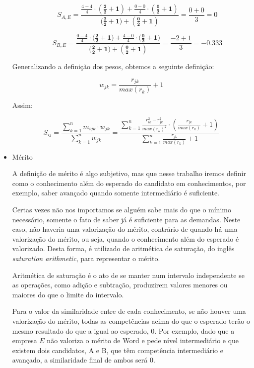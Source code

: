 \documentclass[preprint,12pt]{elsarticle}
\begin{document}
\begin{itemize}
\begin{itemize}
        $$ S_{A,E} = \frac{\tfrac{4 - 4}{4} \cdot \boldsymbol{(\tfrac{2}{2} + 1)} + \tfrac{0 - 0}{4} \cdot \boldsymbol{(\tfrac{0}{2} + 1)}}{(\boldsymbol{\tfrac{2}{2} + 1)} + \boldsymbol{(\tfrac{0}{2} + 1)}} = \frac{0 + 0}{3} = 0 $$
        
        $$ S_{B,E} = \frac{\tfrac{0 - 4}{4} \cdot (\boldsymbol{\tfrac{2}{2} + 1)} + \tfrac{4 - 0}{4} \cdot (\boldsymbol{\tfrac{0}{2} + 1)}}{(\boldsymbol{\tfrac{2}{2} + 1)} + \boldsymbol{(\tfrac{0}{2} + 1)}} = \frac{-2 + 1}{3} = -0.333 $$
        
    \end{itemize}
    
    Generalizando a definição dos pesos, obtemos a seguinte definição:
    
    \begin{equation}
        w_{jk} = \frac{r_{jk}}{max(r_k)} + 1
    \end{equation}
    
    Assim:
    
    \begin{equation}
    S_{ij} = \frac{\sum_{k=1}^n m_{ijk} \cdot w_{jk}}
                  {\sum_{k=1}^n w_{jk}} = 
             \frac{\sum_{k=1}^n \frac{r_{ik}^2 - r_{jk}^2}{max(r_k)^2} \cdot (\frac{r_{jk}}{max(r_k)} + 1)}
                  {\sum_{k=1}^n {\frac{r_{jk}}{max(r_k)} + 1}}
    \end{equation}

    \item Mérito
    
    A definição de mérito é algo subjetivo, mas que nesse trabalho iremos definir como o conhecimento além do esperado do candidato em conhecimentos, por exemplo, saber avançado quando somente intermediário é suficiente. 
    
    Certas vezes não nos importamos se alguém sabe mais do que o mínimo necessário, somente o fato de saber já é suficiente para as demandas. Neste caso, não haveria uma valorização do mérito, contrário de quando há uma valorização do mérito, ou seja, quando o conhecimento além do esperado é valorizado. Desta forma, é utilizado de aritmética de saturação, do inglês \textit{saturation arithmetic}, para representar o mérito.
    
    Aritmética de saturação é o ato de se manter num intervalo independente se as operações, como adição e subtração, produzirem valores menores ou maiores do que o limite do intervalo.
    
    Para o valor da similaridade entre de cada conhecimento, se não houver uma valorização do mérito, todas as competências acima do que o esperado terão o mesmo resultado do que a igual ao esperado, 0. Por exemplo, dado que a empresa $E$ não valoriza o mérito de Word e pede nível intermediário e que existem dois candidatos, A e B, que têm competência intermediário e avançado, a similaridade final de ambos será 0.
    

\end{itemize}
\end{document}
